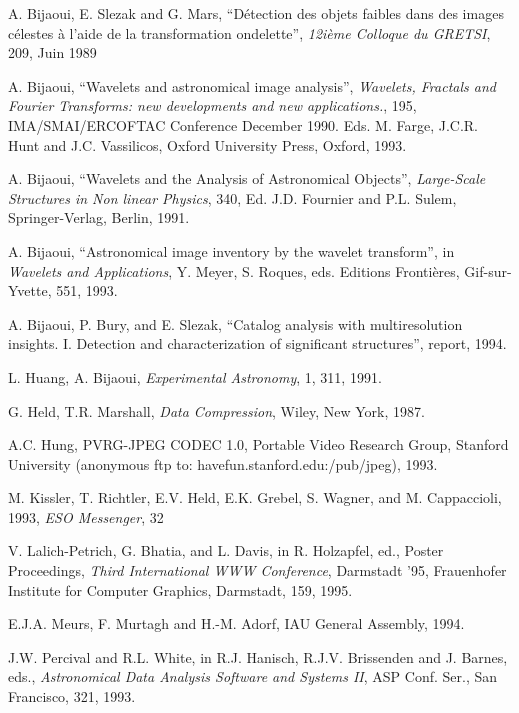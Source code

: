 \begin{thebibliography}{99}

 A. Bijaoui, E. Slezak and G. Mars,
``D\'etection des objets faibles dans des images c\'elestes \`a l'aide de 
la transformation ondelette'', 
{\it 12i\`eme Colloque du GRETSI},  209, Juin 1989 

 A. Bijaoui,
``Wavelets and astronomical image analysis'', 
{\sl Wavelets, Fractals and Fourier Transforms: new developments and new
applications.}, 195, IMA/SMAI/ERCOFTAC Conference December 1990. Eds.
M. Farge,
J.C.R. Hunt and J.C. Vassilicos, Oxford University Press, Oxford, 1993.

 A. Bijaoui,
``Wavelets and the Analysis of Astronomical Objects'', 
{\it Large-Scale Structures in Non linear Physics}, 340, Ed. 
J.D. Fournier
and 
P.L. Sulem, Springer-Verlag, Berlin, 1991.

 A. Bijaoui, ``Astronomical image inventory by the 
wavelet transform'', in {\it Wavelets and Applications}, Y. Meyer, S. Roques,
eds.  Editions 
Fronti\`eres, Gif-sur-Yvette, 551, 1993.


 A. Bijaoui, P. Bury, and E. Slezak, ``Catalog analysis
with multiresolution insights.  I. Detection and characterization of 
significant structures'', report, 1994.

 L. Huang, A. Bijaoui, {\it Experimental Astronomy}, 
1, 311, 1991.

 G. Held, T.R. Marshall, {\it Data Compression},
Wiley, New York, 1987.

 A.C. Hung, PVRG-JPEG CODEC 1.0, Portable Video Research Group, 
Stanford University (anonymous ftp to: havefun.stanford.edu:/pub/jpeg), 1993.

 M. Kissler, T. Richtler, E.V. Held, E.K. Grebel, S. 
Wagner, and M. Cappaccioli, 1993, {\it ESO Messenger}, 32

 V. Lalich-Petrich, G. Bhatia, and L. Davis, in R. Holzapfel, ed., 
 Poster Proceedings,
{\it Third International WWW Conference}, 
Darmstadt '95, Frauenhofer Institute for
Computer Graphics, Darmstadt, 159, 1995.

 E.J.A. Meurs, F. Murtagh and H.-M. Adorf, IAU General 
Assembly, 1994.

 J.W. Percival and R.L. White, in 
R.J. Hanisch, R.J.V. Brissenden and J. Barnes, eds., 
{\it Astronomical Data Analysis Software
and Systems II}, ASP Conf. Ser., San Francisco, 321, 1993.



\end{thebibliography}
